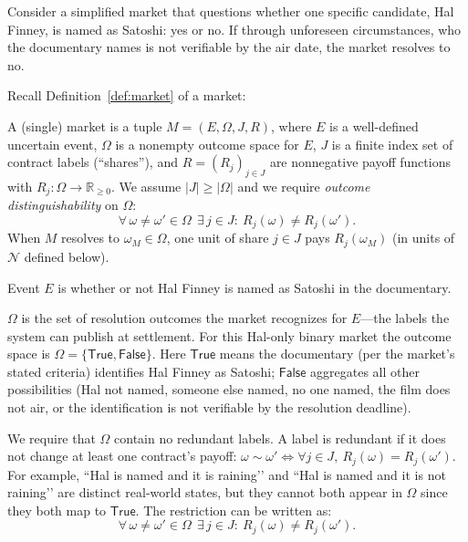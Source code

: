 Consider a simplified market that questions whether one specific candidate, \eg Hal Finney, is named as Satoshi: yes or no. If through unforeseen circumstances, who the documentary names is not verifiable by the air date, the market resolves to no.

Recall Definition~\ref{def:market} of a market: 

\begin{definition}[Market]
A (single) market is a tuple $M=(E,\Omega,J,R)$, where $E$ is a well-defined uncertain event, $\Omega$ is a nonempty outcome space for $E$, $J$ is a finite index set of contract labels (“shares”), and $R=(R_j)_{j\in J}$ are nonnegative payoff functions with $R_j:\Omega\to\mathbb{R}_{\ge 0}$. 
We assume $|J|\ge|\Omega|$ and we require \emph{outcome distinguishability} on $\Omega$:
\[
\forall\,\omega\neq\omega'\in\Omega\ \ \exists\,j\in J:\ R_j(\omega)\neq R_j(\omega').
\]
When $M$ resolves to $\omega_M\in\Omega$, one unit of share $j\in J$ pays $R_j(\omega_M)$ (in units of $\mathcal{N}$ defined below).
\end{definition}

Event $E$ is whether or not Hal Finney is named as Satoshi in the documentary.

$\Omega$ is the set of resolution outcomes the market recognizes for $E$—the labels the system can publish at settlement. For this Hal-only binary market the outcome space is $\Omega=\{\mathsf{True},\mathsf{False}\}$. Here $\mathsf{True}$ means the documentary (per the market’s stated criteria) identifies Hal Finney as Satoshi; $\mathsf{False}$ aggregates all other possibilities (Hal not named, someone else named, no one named, the film does not air, or the identification is not verifiable by the resolution deadline).


We require that $\Omega$ contain no redundant labels. A label is redundant if it does not change at least one contract’s payoff: $\omega\sim\omega' \iff \forall j\in J,\ R_j(\omega)=R_j(\omega')$. For example, “Hal is named and it is raining’’ and “Hal is named and it is not raining’’ are distinct real-world states, but they cannot both appear in $\Omega$ since they both map to $\mathsf{True}$. The restriction can be written as:
\[
\forall\,\omega\neq\omega'\in\Omega\ \ \exists\,j\in J:\ R_j(\omega)\neq R_j(\omega').
\]

